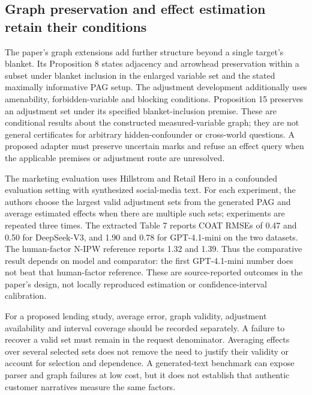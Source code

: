 \subsection{Graph preservation and effect estimation retain their conditions}
\label{exec19:coat-graph}
The paper's graph extensions add further structure beyond a single target's
blanket. Its Proposition 8 states adjacency and arrowhead preservation within
a subset under blanket inclusion in the enlarged variable set and the stated
maximally informative PAG setup. The adjustment development additionally uses
amenability, forbidden-variable and blocking conditions. Proposition 15
preserves an adjustment set under its specified blanket-inclusion premise.
These are conditional results about the constructed measured-variable graph;
they are not general certificates for arbitrary hidden-confounder or
cross-world questions. A proposed adapter must preserve uncertain marks and
refuse an effect query when the applicable premises or adjustment route are
unresolved.~\citep{exec19_coat}

The marketing evaluation uses Hillstrom and Retail Hero in a confounded
evaluation setting with synthesized social-media text. For each experiment,
the authors choose the largest valid adjustment sets from the generated PAG
and average estimated effects when there are multiple such sets; experiments
are repeated three times. The extracted Table 7 reports COAT RMSEs of
0.47 and 0.50 for DeepSeek-V3, and 1.90 and 0.78 for GPT-4.1-mini on the
two datasets. The human-factor N-IPW reference reports 1.32 and 1.39.
Thus the comparative result depends on model and comparator: the first
GPT-4.1-mini number does not beat that human-factor reference. These are
source-reported outcomes in the paper's design, not locally reproduced
estimation or confidence-interval calibration.~\citep{exec19_coat}

For a proposed lending study, average error, graph validity, adjustment
availability and interval coverage should be recorded separately. A failure
to recover a valid set must remain in the request denominator. Averaging
effects over several selected sets does not remove the need to justify their
validity or account for selection and dependence. A generated-text benchmark
can expose parser and graph failures at low cost, but it does not establish
that authentic customer narratives measure the same factors.

